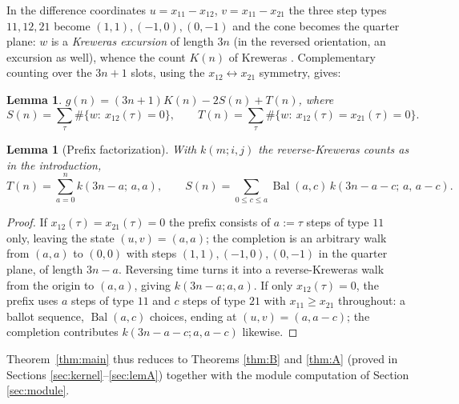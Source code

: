 \documentclass[11pt]{article}
\newtheorem{lemma}[theorem]{Lemma}
\newcommand{\Bal}{\operatorname{Bal}}
\begin{document}
In the difference coordinates $u = x_{11}-x_{12}$, $v = x_{11}-x_{21}$ the three step types $11,12,21$ become $(1,1),(-1,0),(0,-1)$ and the cone becomes the quarter plane: $w$ is a \emph{Kreweras excursion} of length $3n$ (in the reversed orientation, an excursion as well), whence the count $K(n)$ of Kreweras \cite{Kreweras}. Complementary counting over the $3n+1$ slots, using the $x_{12}\leftrightarrow x_{21}$ symmetry, gives:

\begin{lemma}\label{lem:cc}
$\displaystyle g(n) = (3n+1)K(n) - 2S(n) + T(n)$, where
\[ S(n) = \sum_{\tau} \#\{w:\ x_{12}(\tau)=0\},\qquad T(n) = \sum_{\tau} \#\{w:\ x_{12}(\tau)=x_{21}(\tau)=0\}. \]
\end{lemma}

\begin{lemma}[Prefix factorization]\label{lem:pf}
With $k(m;i,j)$ the reverse-Kreweras counts as in the introduction,
\[ T(n) = \sum_{a=0}^{n} k(3n-a;\,a,a), \qquad
S(n) = \sum_{0\le c\le a} \Bal(a,c)\,k(3n-a-c;\,a,\,a-c). \]
\end{lemma}
\begin{proof}
If $x_{12}(\tau)=x_{21}(\tau)=0$ the prefix consists of $a:=\tau$ steps of type $11$ only, leaving the state $(u,v)=(a,a)$; the completion is an arbitrary walk from $(a,a)$ to $(0,0)$ with steps $(1,1),(-1,0),(0,-1)$ in the quarter plane, of length $3n-a$. Reversing time turns it into a reverse-Kreweras walk from the origin to $(a,a)$, giving $k(3n-a;a,a)$. If only $x_{12}(\tau)=0$, the prefix uses $a$ steps of type $11$ and $c$ steps of type $21$ with $x_{11}\ge x_{21}$ throughout: a ballot sequence, $\Bal(a,c)$ choices, ending at $(u,v)=(a,a-c)$; the completion contributes $k(3n-a-c;a,a-c)$ likewise.
\end{proof}

Theorem~\ref{thm:main} thus reduces to Theorems \ref{thm:B} and \ref{thm:A} (proved in Sections \ref{sec:kernel}--\ref{sec:lemA}) together with the module computation of Section \ref{sec:module}.
\end{document}
